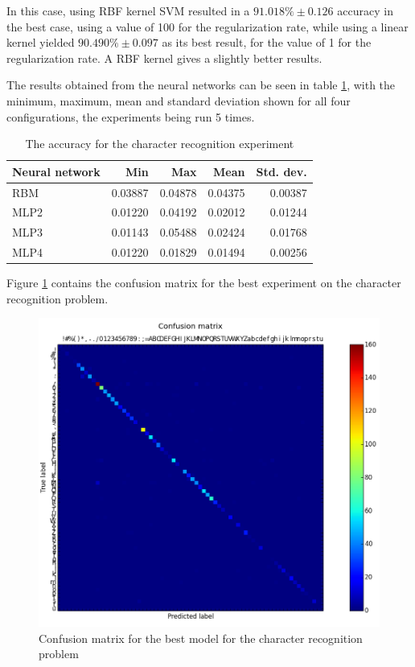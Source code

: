 In this case, using RBF kernel SVM resulted in a $ 91.018\% \pm 0.126 $ accuracy in the best case, using a value of 100 for the regularization rate, while using a linear kernel yielded $ 90.490\% \pm 0.097 $ as its best result, for the value of 1 for the regularization rate. A RBF kernel gives a slightly better results.

The results obtained from the neural networks can be seen in table \ref{table:nn_table}, with the minimum, maximum, mean and standard deviation shown for all four configurations, the experiments being run 5 times. 

\begin{table}[h]
\caption{The accuracy for the character recognition experiment}
\label{table:nn_table}
\begin{tabular}{lrrrr}
\toprule
Neural network & Min     & Max     & Mean    & Std. dev. \\ 
\midrule
RBM & 0.03887 & 0.04878 & 0.04375 & 0.00387 \\
MLP2 & 0.01220 & 0.04192 & 0.02012 & 0.01244 \\
MLP3 & 0.01143 & 0.05488 & 0.02424 & 0.01768 \\
MLP4 & 0.01220 & 0.01829 & 0.01494 & 0.00256 \\ 
\bottomrule
\end{tabular}
\end{table}

Figure \ref{fig:conf_matrix} contains the confusion matrix for the best experiment on the character recognition problem.


\begin{figure}[h!]
\begin{center}
\includegraphics[width=0.8\linewidth]{img/rec_cm.png}
\caption{\label{fig:conf_matrix}
Confusion matrix for the best model for the character recognition problem}
\end{center}
\end{figure}


